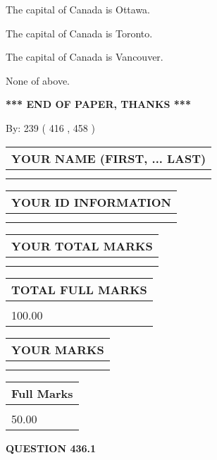 \documentclass[12pt]{article}
\begin{document}
  
 
 
The capital of Canada is Ottawa.
 
 
The capital of Canada is Toronto.
 
 
The capital of Canada is Vancouver.
 
 
 None of above.
 
 
   
   
\vspace{1.0in} 
{\textbf{\large{ *** END OF PAPER, THANKS *** }}} 
   
   
\hspace{1.0in} By: 
 239 ( 416 ,  458 )
   
   
   
   
\newpage 
\setcounter{page}{ 
   436001 } 
   
   
   
   
\noindent\begin{tabular}{|l|}
\hline
YOUR NAME (FIRST, ... LAST)  \\
\hline
 \\ 
 \\ 
\hline
\end{tabular}
\hspace{0.05in} \begin{tabular}{|l|}
\hline
 YOUR   ID   INFORMATION  \\
\hline
 \\ 
 \\ 
\hline
\end{tabular}
   
   
\vspace{0.2in}\noindent\begin{tabular}{|l|}
\hline
YOUR TOTAL MARKS  \\
\hline
 \\ 
 \\ 
\hline
\end{tabular}
\hspace{0.05in} \begin{tabular}{|l|}
\hline
TOTAL FULL MARKS  \\
\hline
 \\ 
100.00 \\
\hline
\end{tabular}
  
\vspace{0.2in}
  
\noindent\begin{tabular}{|l|}
\hline
 YOUR MARKS  \\
\hline
 \\ 
 \\ 
\hline
\end{tabular}
\hspace{0.05in} \begin{tabular}{|l|}
\hline
 Full Marks  \\
\hline
 \\ 
50.00 \\
\hline
\end{tabular}
{\textbf{\Large{QUESTION
436.1 
}}}
  
\end{document}
